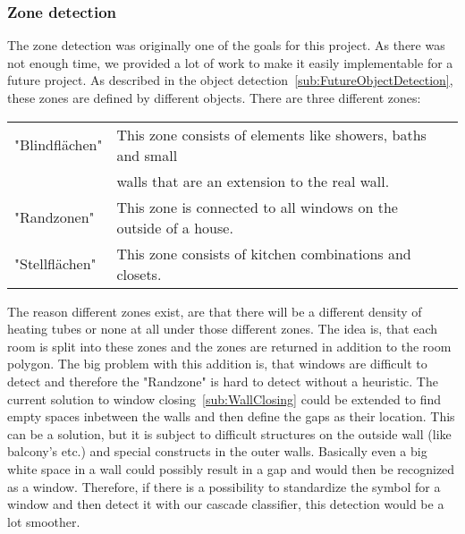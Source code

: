 \subsubsection{Zone detection}
\label{sub:RoomZones}
\label{sub:ZoneDetection}
The zone detection was originally one of the goals for this project. As there was not enough time, we provided a lot of work to make it easily implementable for a future project. As described in the object detection~\ref{sub:FutureObjectDetection}, these zones are defined by different objects.
There are three different zones:
\begin{table}[H]
	\centering
	\label{tab:Zones}
	\begin{tabular}{@{}lll@{}}
		"Blindflächen" & This zone consists of elements like showers, baths and small \\
		& walls that are an extension to the real wall.\\
		"Randzonen" &  This zone is connected to all windows on the outside of a house. \\
		"Stellflächen" & This zone consists of kitchen combinations and closets.\\
	\end{tabular}
\end{table}	

The reason different zones exist, are that there will be a different density of heating tubes or none at all under those different zones. The idea is, that each room is split into these zones and the zones are returned in addition to the room polygon. The big problem with this addition is, that windows are difficult to detect and therefore the "Randzone" is hard to detect without a heuristic. The current solution to window closing~\ref{sub:WallClosing} could be extended to find empty spaces inbetween the walls and then define the gaps as their location. This can be a solution, but it is subject to difficult structures on the outside wall (like balcony's etc.) and special constructs in the outer walls. Basically even a big white space in a wall could possibly result in a gap and would then be recognized as a window. Therefore, if there is a possibility to standardize the symbol for a window and then detect it with our cascade classifier, this detection would be a lot smoother.

